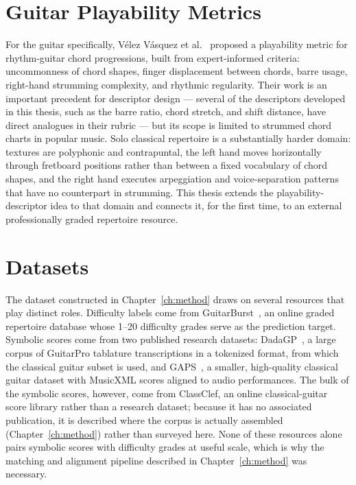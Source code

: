 \section{Guitar Playability Metrics}
For the guitar specifically, V{\'e}lez V{\'a}squez et al.~\cite{vasquez2023quantifying} proposed a playability metric for rhythm-guitar chord progressions, built from expert-informed criteria: uncommonness of chord shapes, finger displacement between chords, barre usage, right-hand strumming complexity, and rhythmic regularity. Their work is an important precedent for descriptor design --- several of the descriptors developed in this thesis, such as the barre ratio, chord stretch, and shift distance, have direct analogues in their rubric --- but its scope is limited to strummed chord charts in popular music. Solo classical repertoire is a substantially harder domain: textures are polyphonic and contrapuntal, the left hand moves horizontally through fretboard positions rather than between a fixed vocabulary of chord shapes, and the right hand executes arpeggiation and voice-separation patterns that have no counterpart in strumming. This thesis extends the playability-descriptor idea to that domain and connects it, for the first time, to an external professionally graded repertoire resource.

\section{Datasets}
The dataset constructed in Chapter~\ref{ch:method} draws on several resources that play distinct roles. Difficulty labels come from GuitarBurst~\cite{guitarburst}, an online graded repertoire database whose 1--20 difficulty grades serve as the prediction target. Symbolic scores come from two published research datasets: DadaGP~\cite{sarmento2021dadagp}, a large corpus of GuitarPro tablature transcriptions in a tokenized format, from which the classical guitar subset is used, and GAPS~\cite{riley2024gaps}, a smaller, high-quality classical guitar dataset with MusicXML scores aligned to audio performances. The bulk of the symbolic scores, however, come from ClassClef, an online classical-guitar score library rather than a research dataset; because it has no associated publication, it is described where the corpus is actually assembled (Chapter~\ref{ch:method}) rather than surveyed here. None of these resources alone pairs symbolic scores with difficulty grades at useful scale, which is why the matching and alignment pipeline described in Chapter~\ref{ch:method} was necessary.
